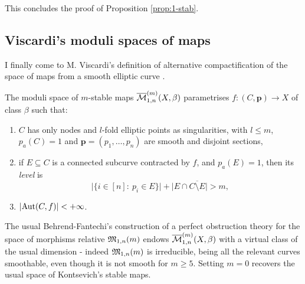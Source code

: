 This concludes the proof of Proposition \ref{prop:1-stab}.

\subsection{Viscardi's moduli spaces of maps}\label{sec:Visc} I finally come to M. Viscardi's definition of alternative compactification of the space of maps from a smooth elliptic curve \cite[Definition 2.15]{VISC}.

\begin{dfn}\label{def:Visc}
 The moduli space of $m$-stable maps $\overline{\mathcal{M}}^{(m)}_{1,n}(X,\beta)$ parametrises $f\colon (C,\mathbf p)\to X$ of class $\beta$ such that:\begin{enumerate}
                                                                                                                                      \item $C$ has only nodes and $l$-fold elliptic points as singularities, with $l\leq m$, $p_a(C)=1$ and $\mathbf{p}=(p_1,\ldots,p_n)$ are smooth and disjoint sections,
                                                                                                                                      \item if $E\subseteq C$ is a connected subcurve contracted by $f$, and $p_a(E)=1$, then its \emph{level} is \[\lvert \{i\in[n]:\ p_i\in E\}\rvert+\lvert E\cap \overline{C\setminus E}\rvert >m,\]
                                                                                                                                      \item $\lvert\operatorname{Aut}(C,f)\rvert<+\infty$.
                                                                                                                                     \end{enumerate}

\end{dfn}

The usual Behrend-Fantechi's construction of a perfect obstruction theory for the space of morphisms relative $\mathfrak M_{1,n}(m)$  \cite[Proposition 6.2]{BF} endows $\overline{\mathcal{M}}^{(m)}_{1,n}(X,\beta)$ with a virtual class of the usual dimension - indeed $\mathfrak M_{1,n}(m)$ is irreducible, being all the relevant curves smoothable, even though it is not smooth for $m\geq 5$. Setting $m=0$ recovers the usual space of Kontsevich's stable maps.

